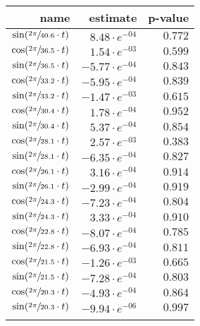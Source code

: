 \begin{tabular}{r|rr}
\hline
 name                               & estimate              & p-value   \\
\hline
 $\sin(\sfrac{2\pi}{40.6} \cdot t)$ & $8.48 \cdot e^{-04}$  & $0.772$   \\
 $\cos(\sfrac{2\pi}{36.5} \cdot t)$ & $1.54 \cdot e^{-03}$  & $0.599$   \\
 $\sin(\sfrac{2\pi}{36.5} \cdot t)$ & $-5.77 \cdot e^{-04}$ & $0.843$   \\
 $\cos(\sfrac{2\pi}{33.2} \cdot t)$ & $-5.95 \cdot e^{-04}$ & $0.839$   \\
 $\sin(\sfrac{2\pi}{33.2} \cdot t)$ & $-1.47 \cdot e^{-03}$ & $0.615$   \\
 $\cos(\sfrac{2\pi}{30.4} \cdot t)$ & $1.78 \cdot e^{-04}$  & $0.952$   \\
 $\sin(\sfrac{2\pi}{30.4} \cdot t)$ & $5.37 \cdot e^{-04}$  & $0.854$   \\
 $\cos(\sfrac{2\pi}{28.1} \cdot t)$ & $2.57 \cdot e^{-03}$  & $0.383$   \\
 $\sin(\sfrac{2\pi}{28.1} \cdot t)$ & $-6.35 \cdot e^{-04}$ & $0.827$   \\
 $\cos(\sfrac{2\pi}{26.1} \cdot t)$ & $3.16 \cdot e^{-04}$  & $0.914$   \\
 $\sin(\sfrac{2\pi}{26.1} \cdot t)$ & $-2.99 \cdot e^{-04}$ & $0.919$   \\
 $\cos(\sfrac{2\pi}{24.3} \cdot t)$ & $-7.23 \cdot e^{-04}$ & $0.804$   \\
 $\sin(\sfrac{2\pi}{24.3} \cdot t)$ & $3.33 \cdot e^{-04}$  & $0.910$   \\
 $\cos(\sfrac{2\pi}{22.8} \cdot t)$ & $-8.07 \cdot e^{-04}$ & $0.785$   \\
 $\sin(\sfrac{2\pi}{22.8} \cdot t)$ & $-6.93 \cdot e^{-04}$ & $0.811$   \\
 $\cos(\sfrac{2\pi}{21.5} \cdot t)$ & $-1.26 \cdot e^{-03}$ & $0.665$   \\
 $\sin(\sfrac{2\pi}{21.5} \cdot t)$ & $-7.28 \cdot e^{-04}$ & $0.803$   \\
 $\cos(\sfrac{2\pi}{20.3} \cdot t)$ & $-4.93 \cdot e^{-04}$ & $0.864$   \\
 $\sin(\sfrac{2\pi}{20.3} \cdot t)$ & $-9.94 \cdot e^{-06}$ & $0.997$   \\
                                    &                       &           \\
\hline
\end{tabular}